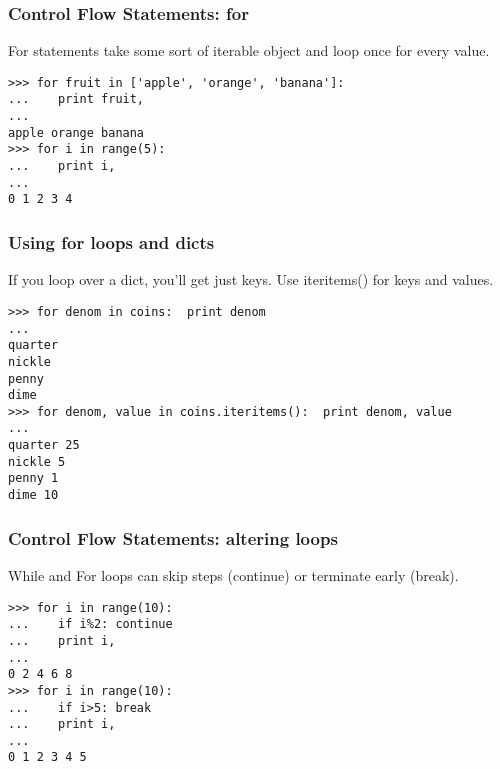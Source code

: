 \documentclass[10pt]{beamer}
\newcommand\smallfont{\fontsize{8pt}{7.2}\selectfont}
\begin{document}
\begin{frame}[fragile]
\frametitle{Control Flow Statements: for}

For statements take some sort of iterable object and loop once for 
every value.

\begin{verbatim}
>>> for fruit in ['apple', 'orange', 'banana']:
...    print fruit, 
... 
apple orange banana
>>> for i in range(5):
...    print i,
... 
0 1 2 3 4 

\end{verbatim}

\end{frame}

\begin{frame}[fragile]
\frametitle{Using for loops and dicts}
If you loop over a dict, you'll get just keys.  Use iteritems() for keys and values.

\smallfont
\begin{verbatim}
>>> for denom in coins:  print denom
... 
quarter
nickle
penny
dime
>>> for denom, value in coins.iteritems():  print denom, value
... 
quarter 25
nickle 5
penny 1
dime 10

\end{verbatim}
\end{frame}


\begin{frame}[fragile]
\frametitle{Control Flow Statements: altering loops}

While and For loops can skip steps (continue) or terminate early (break).

\begin{verbatim}
>>> for i in range(10):
...    if i%2: continue
...    print i, 
... 
0 2 4 6 8
>>> for i in range(10):
...    if i>5: break
...    print i,
... 
0 1 2 3 4 5
\end{verbatim}

\end{frame}
\end{document}
